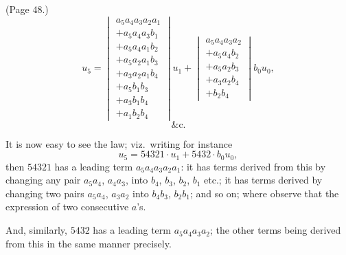\documentclass[11pt,a4paper]{article}
\begin{document}
\bigskip

\noindent (Page 48.)
\[
u_5 = \begin{vmatrix} a_5 a_4 a_3 a_2 a_1 \\ + a_5 a_4 a_3 b_1 \\ + a_5 a_4 a_1 b_2 \\ + a_5 a_2 a_1 b_3 \\ + a_3 a_2 a_1 b_4 \\ + a_5 b_1 b_3 \\ + a_3 b_1 b_4 \\ + a_1 b_2 b_4 \end{vmatrix} u_1 + \begin{vmatrix} a_5 a_4 a_3 a_2 \\ + a_5 a_4 b_2 \\ + a_5 a_2 b_3 \\ + a_3 a_2 b_4 \\ + b_2 b_4 \end{vmatrix} b_0 u_0,
\]
\[
\&\text{c.}
\]

It is now easy to see the law; viz.\ writing for instance
\[
u_5 = 54321 \cdot u_1 + 5432 \cdot b_0 u_0,
\]
then $54321$ has a leading term $a_5 a_4 a_3 a_2 a_1$: it has terms derived from this by changing any pair $a_5 a_4$, $a_4 a_3$, into $b_4$, $b_3$, $b_2$, $b_1$ etc.; it has terms derived by changing two pairs $a_5 a_4$, $a_3 a_2$ into $b_4 b_3$, $b_2 b_1$; and so on; where observe that the expression of two consecutive $a$'s.

And, similarly, $5432$ has a leading term $a_5 a_4 a_3 a_2$; the other terms being derived from this in the same manner precisely.
\end{document}

